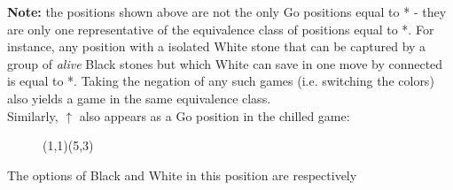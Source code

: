 \documentclass[../math194_paper.tex]{subfiles}
\begin{document}
\textbf{Note:} the positions shown above are not the only Go positions equal to * - they are only 
one representative of the equivalence class of positions equal to *. For instance, any position 
with a isolated White stone that can be captured by a group of \textit{alive} Black stones but which White 
can save in one move by connected is equal to *. 
Taking the negation of any such games (i.e. switching the colors) also yields a game in the same equivalence class. \\

Similarly, $\uparrow$ also appears as a Go position in the chilled game:
\begin{figure}[H]
    \centering
    \begin{psgopartialboard*}{(1,1)(5,3)}
        
     \end{psgopartialboard*}
\end{figure}
The options of Black and White in this position are respectively
\end{document}
